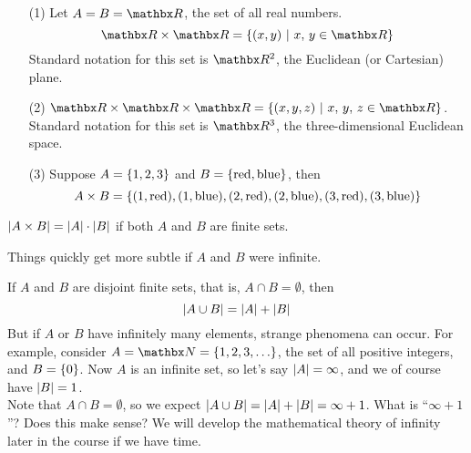 
\begin{example}\hfill
\begin{itemize}[itemsep = 1em]
\item[(1)] Let $A = B = \rr$, the set of all real numbers.
\[\rr \times \rr = \setp{(x,y)}{x,\,y \in \rr}\]
Standard notation for this set is $\rr^2$, the Euclidean (or Cartesian) plane.

\item[(2)] $\rr \times \rr \times \rr = \setp{(x,y,z)}{x,\,y,\,z \in \rr}$. Standard notation for this set is $\rr^3$, the three-dimensional Euclidean space.

\item[(3)] Suppose $A = \left\{1,2,3\right\}$ and $B = \left\{\text{red},\text{blue}\right\}$, then
\[A \times B = \left\{(1,\text{red}),(1,\text{blue}),(2,\text{red}),(2,\text{blue}),(3,\text{red}),(3,\text{blue})\right\}\]
\end{itemize}
\end{example}

\vspace*{1em}

\begin{lemma}
$\left\lvert A \times B\right\rvert = \left\lvert A\right\rvert\cdot \left\lvert B\right\rvert$ if both $A$ and $B$ are finite sets.
\end{lemma}
Things quickly get more subtle if $A$ and $B$ were infinite. 

\vspace*{1em}

\begin{remark}
If $A$ and $B$ are disjoint finite sets, that is, $A \cap B = \emptyset$, then
\[\left\lvert A \cup B\right\rvert = \left\lvert A\right\rvert + \left\lvert B\right\rvert\]
But if $A$ or $B$ have infinitely many elements, strange phenomena can occur. For example, consider $A = \nn = \set{1,2,3,\ldots}$, the set of all positive integers, and $B = \left\{0\right\}$. Now $A$ is an infinite set, so let's say $\left\lvert A\right\rvert = \infty$, and we of course have $\left\lvert B\right\rvert = 1$.\\[0.5em]
Note that $A \cap B = \emptyset$, so we expect $\left\lvert A \cup B\right\rvert = \left\lvert A\right\rvert + \left\lvert B\right\rvert = \infty + 1$. What is ``$\infty + 1$''? Does this make sense? We will develop the mathematical theory of infinity later in the course if we have time.
\end{remark}